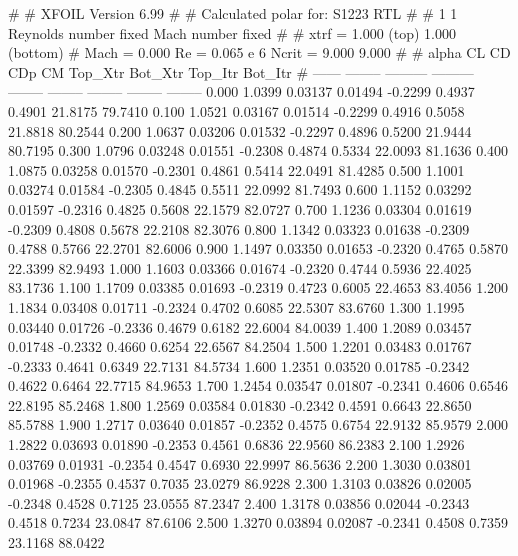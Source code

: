 #  
#       XFOIL         Version 6.99
#  
# Calculated polar for: S1223 RTL                                       
#  
# 1 1 Reynolds number fixed          Mach number fixed         
#  
# xtrf =   1.000 (top)        1.000 (bottom)  
# Mach =   0.000     Re =     0.065 e 6     Ncrit =   9.000  9.000
#  
#   alpha    CL        CD       CDp       CM     Top_Xtr  Bot_Xtr  Top_Itr  Bot_Itr
#  ------ -------- --------- --------- -------- -------- -------- -------- --------
   0.000   1.0399   0.03137   0.01494  -0.2299   0.4937   0.4901  21.8175  79.7410
   0.100   1.0521   0.03167   0.01514  -0.2299   0.4916   0.5058  21.8818  80.2544
   0.200   1.0637   0.03206   0.01532  -0.2297   0.4896   0.5200  21.9444  80.7195
   0.300   1.0796   0.03248   0.01551  -0.2308   0.4874   0.5334  22.0093  81.1636
   0.400   1.0875   0.03258   0.01570  -0.2301   0.4861   0.5414  22.0491  81.4285
   0.500   1.1001   0.03274   0.01584  -0.2305   0.4845   0.5511  22.0992  81.7493
   0.600   1.1152   0.03292   0.01597  -0.2316   0.4825   0.5608  22.1579  82.0727
   0.700   1.1236   0.03304   0.01619  -0.2309   0.4808   0.5678  22.2108  82.3076
   0.800   1.1342   0.03323   0.01638  -0.2309   0.4788   0.5766  22.2701  82.6006
   0.900   1.1497   0.03350   0.01653  -0.2320   0.4765   0.5870  22.3399  82.9493
   1.000   1.1603   0.03366   0.01674  -0.2320   0.4744   0.5936  22.4025  83.1736
   1.100   1.1709   0.03385   0.01693  -0.2319   0.4723   0.6005  22.4653  83.4056
   1.200   1.1834   0.03408   0.01711  -0.2324   0.4702   0.6085  22.5307  83.6760
   1.300   1.1995   0.03440   0.01726  -0.2336   0.4679   0.6182  22.6004  84.0039
   1.400   1.2089   0.03457   0.01748  -0.2332   0.4660   0.6254  22.6567  84.2504
   1.500   1.2201   0.03483   0.01767  -0.2333   0.4641   0.6349  22.7131  84.5734
   1.600   1.2351   0.03520   0.01785  -0.2342   0.4622   0.6464  22.7715  84.9653
   1.700   1.2454   0.03547   0.01807  -0.2341   0.4606   0.6546  22.8195  85.2468
   1.800   1.2569   0.03584   0.01830  -0.2342   0.4591   0.6643  22.8650  85.5788
   1.900   1.2717   0.03640   0.01857  -0.2352   0.4575   0.6754  22.9132  85.9579
   2.000   1.2822   0.03693   0.01890  -0.2353   0.4561   0.6836  22.9560  86.2383
   2.100   1.2926   0.03769   0.01931  -0.2354   0.4547   0.6930  22.9997  86.5636
   2.200   1.3030   0.03801   0.01968  -0.2355   0.4537   0.7035  23.0279  86.9228
   2.300   1.3103   0.03826   0.02005  -0.2348   0.4528   0.7125  23.0555  87.2347
   2.400   1.3178   0.03856   0.02044  -0.2343   0.4518   0.7234  23.0847  87.6106
   2.500   1.3270   0.03894   0.02087  -0.2341   0.4508   0.7359  23.1168  88.0422
